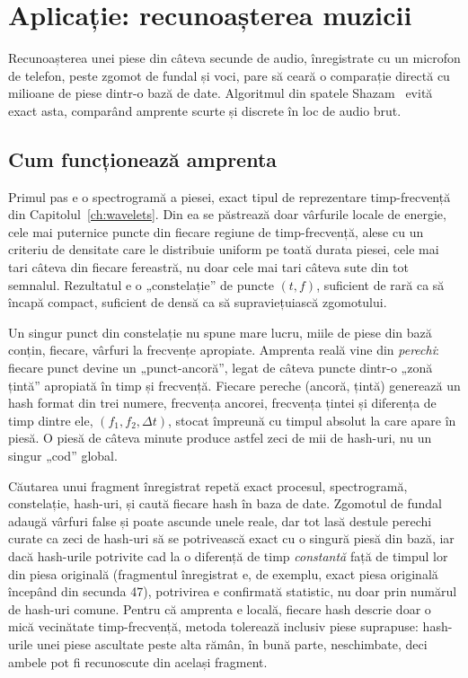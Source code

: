 \chapter{Aplicație: recunoașterea muzicii}
\label{ch:shazam}

Recunoașterea unei piese din câteva secunde de audio, înregistrate cu un
microfon de telefon, peste zgomot de fundal și voci, pare să ceară o
comparație directă cu milioane de piese dintr-o bază de date. Algoritmul
din spatele Shazam~\cite{wang2003} evită exact asta, comparând amprente
scurte și discrete în loc de audio brut.

\section{Cum funcționează amprenta}

Primul pas e o spectrogramă a piesei, exact tipul de reprezentare
timp-frecvență din Capitolul~\ref{ch:wavelets}. Din ea se păstrează doar
vârfurile locale de energie, cele mai puternice puncte din fiecare regiune
de timp-frecvență, alese cu un criteriu de densitate care le distribuie
uniform pe toată durata piesei, cele mai tari câteva din fiecare fereastră,
nu doar cele mai tari câteva sute din tot semnalul.
Rezultatul e o „constelație” de puncte $(t, f)$, suficient de rară ca să
încapă compact, suficient de densă ca să supraviețuiască zgomotului.

Un singur punct din constelație nu spune mare lucru, miile de piese din
bază conțin, fiecare, vârfuri la frecvențe apropiate. Amprenta reală vine
din \emph{perechi}: fiecare punct devine un „punct-ancoră”, legat de câteva
puncte dintr-o „zonă țintă” apropiată în timp și frecvență. Fiecare pereche
(ancoră, țintă) generează un hash format din trei numere, frecvența
ancorei, frecvența țintei și diferența de timp dintre ele,
$(f_1, f_2, \Delta t)$, stocat împreună cu timpul absolut la care apare în
piesă. O piesă de câteva minute produce astfel zeci de mii de hash-uri, nu
un singur „cod” global.

Căutarea unui fragment înregistrat repetă exact procesul, spectrogramă,
constelație, hash-uri, și caută fiecare hash în baza de date. Zgomotul de
fundal adaugă vârfuri false și poate ascunde unele reale, dar tot lasă
destule perechi curate ca zeci de hash-uri să se potrivească exact cu o
singură piesă din bază, iar dacă hash-urile potrivite cad la o diferență de
timp \emph{constantă} față de timpul lor din piesa originală (fragmentul
înregistrat e, de exemplu, exact piesa originală începând din secunda 47),
potrivirea e confirmată statistic, nu doar prin numărul de hash-uri comune.
Pentru că amprenta e locală, fiecare hash descrie doar o mică vecinătate
timp-frecvență, metoda tolerează inclusiv piese suprapuse: hash-urile unei
piese ascultate peste alta rămân, în bună parte, neschimbate, deci ambele
pot fi recunoscute din același fragment.

